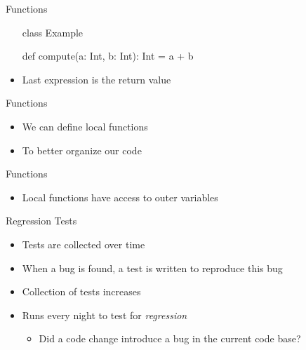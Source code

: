 \begin{frame}[fragile]{Functions}
\begin{itemize}
\begin{chisel}
class Example {
  
  def compute(a: Int, b: Int): Int = {
    a + b
  }
}
\end{chisel}
\item Last expression is the return value
\end{itemize}
\end{frame}

\begin{frame}[fragile]{Functions}
\begin{itemize}
\begin{chisel}
class Example {
  
  def complexCompute(a: Int, b: Int, c: Int): Int = {
  
    def add(x: Int, y: Int) {
      x + y
    }
    
    add(a, b) + c
  }
}
\end{chisel}
\item We can define local functions
\item To better organize our code
\end{itemize}
\end{frame}

\begin{frame}[fragile]{Functions}
\begin{itemize}
\begin{chisel}
class Example {
  
  def complexCompute(a: Int, b: Int, c: Int): Int = {
  
    def add() {
      a + b
    }
    
    add() + c
  }
}
\end{chisel}
\item Local functions have access to outer variables
\end{itemize}
\end{frame}


\begin{frame}[fragile]{Regression Tests}
\begin{itemize}
\item Tests are collected over time
\item When a bug is found, a test is written to reproduce this bug
\item Collection of tests increases
\item Runs every night to test for \emph{regression}
\begin{itemize}
\item Did a code change introduce a bug in the current code base?
\end{itemize}
\end{itemize}
\end{frame}


